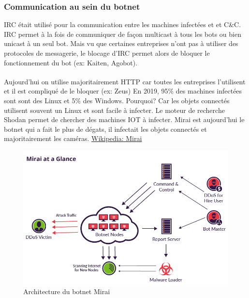 \documentclass[12pt, oneside]{article}
\begin{document}
\subsubsection{Communication au sein du botnet}
IRC était utilisé pour la communication entre les machines infectées et et C\&C. IRC permet à la fois de communiquer de façon multicast à tous les bots ou bien unicast à un seul bot. Mais vu que certaines entreprises n'ont pas à utiliser des protocoles de messagerie, le blocage d'IRC permet alors de bloquer le fonctionnement du bot (ex: Kaiten, Agobot).\\\\
Aujourd'hui on utilise majoritairement HTTP car toutes les entreprises l'utilisent et il est compliqué de le bloquer (ex: Zeus)
En 2019, 95\% des machines infectées sont sont des Linux et 5\% des Windows. Pourquoi? Car les objets connectés utilisent souvent un Linux et sont facile à infecter. Le moteur de recherche Shodan permet de chercher des machines IOT à infecter. Mirai est aujourd'hui le botnet qui a fait le plus de dégats, il infectait les objets connectés et majoritairement les caméras. \href{https://fr.wikipedia.org/wiki/Mirai_(logiciel_malveillant)}{Wikipedia: Mirai}
\begin{figure}[H]
\centering
\includegraphics[scale=0.3]{mirai}
\caption{Architecture du botnet Mirai}
\end{figure}
\end{document}
